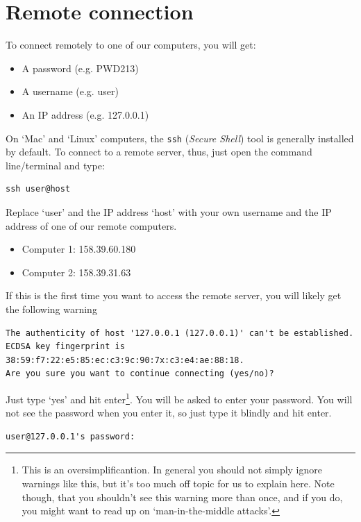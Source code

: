 \documentclass[11pt]{article}
\begin{document}
\section{Remote connection}
\label{sec-1}

To connect remotely to one of our computers, you will get:

\begin{itemize}
\item A password (e.g. PWD213)
\item A username (e.g. user)
\item An IP address (e.g. 127.0.0.1)
\end{itemize}

On `Mac' and `Linux' computers, the \texttt{ssh} (\emph{Secure Shell}) tool is
generally installed by default. To connect to a remote server, thus,
just open the command line/terminal and type:


\begin{verbatim}
ssh user@host
\end{verbatim}


Replace `user' and the IP address `host' with your own
username and the IP address of one of our remote computers.
\begin{itemize}
\item Computer 1: 158.39.60.180
\item Computer 2: 158.39.31.63
\end{itemize}

If this is the first time you want to access the remote server, you
will likely get the following warning


\begin{verbatim}
The authenticity of host '127.0.0.1 (127.0.0.1)' can't be established.
ECDSA key fingerprint is 38:59:f7:22:e5:85:ec:c3:9c:90:7x:c3:e4:ae:88:18.
Are you sure you want to continue connecting (yes/no)?
\end{verbatim}

Just type `yes' and hit enter\footnote{This is an oversimplificantion. In general you should not simply
ignore warnings like this, but it's too much off topic for us to
explain here. Note though, that you shouldn't see this warning more than once,
and if you do, you might want to read up on `man-in-the-middle attacks'.
 }. You will be asked to enter your
password. You will not see the password when you enter it, so just
type it blindly and hit enter.


\begin{verbatim}
user@127.0.0.1's password:
\end{verbatim}
\end{document}
